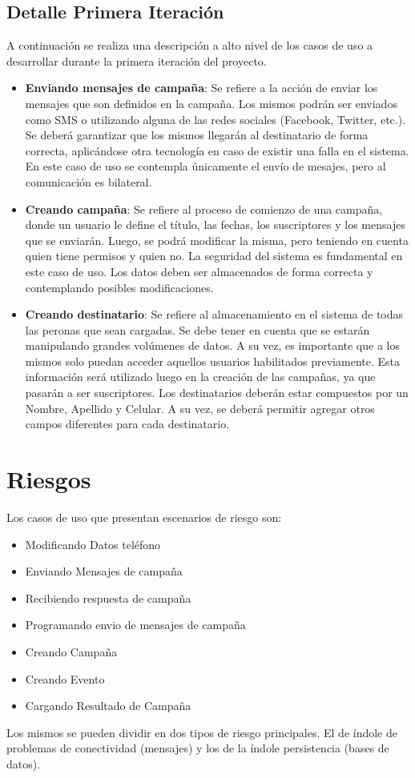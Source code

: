 \documentclass[a4paper, 11pt]{article}
\begin{document}
\subsection{Detalle Primera Iteración}
A continuación se realiza una descripción a alto nivel de los casos de uso a desarrollar durante la primera iteración del proyecto. 
\begin{itemize}
\item \textbf{Enviando mensajes de campaña}: Se refiere a la acción de enviar los mensajes que son definidos en la campaña. Los mismos podrán ser enviados como SMS o utilizando alguna de las redes sociales (Facebook, Twitter, etc.). Se deberá garantizar que los mismos llegarán al destinatario de forma correcta, aplicándose otra tecnología en caso de existir una falla en el sistema. En este caso de uso se contempla únicamente el envío de mesajes, pero al comunicación es bilateral. 
\item \textbf{Creando campaña}: Se refiere al proceso de comienzo de una campaña, donde un usuario le define el título, las fechas, los suscriptores y los mensajes que se enviarán. Luego, se podrá modificar la misma, pero teniendo en cuenta quien tiene permisos y quien no. La seguridad del sistema es fundamental en este caso de uso. Los datos deben ser almacenados de forma correcta y contemplando posibles modificaciones. 
\item \textbf{Creando destinatario}: Se refiere al almacenamiento en el sistema de todas las peronas que sean cargadas. Se debe tener en cuenta que se estarán manipulando grandes volúmenes de datos. A su vez, es importante que a los mismos solo puedan acceder aquellos usuarios habilitados previamente. Esta información será utilizado luego en la creación de las campañas, ya que pasarán a ser suscriptores. Los destinatarios deberán estar compuestos por un Nombre, Apellido y Celular. A su vez, se deberá permitir agregar otros campos diferentes para cada destinatario. 
\end{itemize}

\newpage
\section{Riesgos}

Los casos de uso que presentan escenarios de riesgo son:
\begin{itemize}
\item Modificando Datos teléfono
\item Enviando Mensajes de campaña
\item Recibiendo respuesta de campaña
\item Programando envio de mensajes de campaña
\item Creando Campaña
\item Creando Evento
\item Cargando Resultado de Campaña
\end{itemize}
Los mismos se pueden dividir en dos tipos de riesgo principales. El de índole de problemas de conectividad (mensajes) y los de la índole persistencia (bases de datos).
\end{document}
